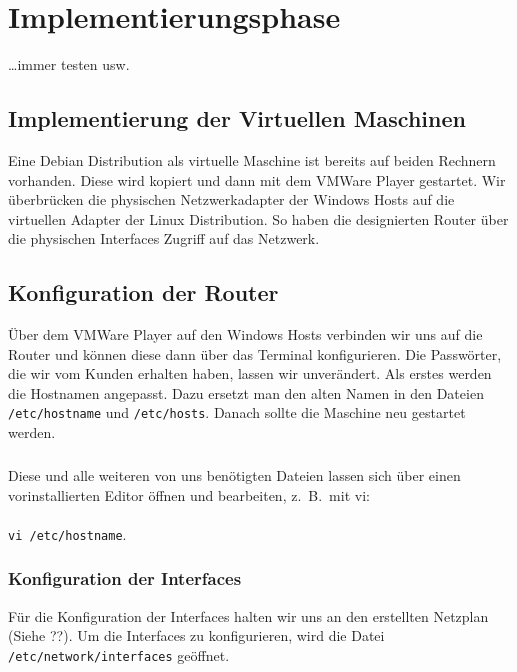 \section{Implementierungsphase} 
\label{sec:Implementierungsphase}

\dots immer testen usw.


\subsection{Implementierung der Virtuellen Maschinen}
\label{subsec:ImplementierungVMs}
Eine Debian Distribution als virtuelle Maschine ist bereits auf beiden Rechnern vorhanden. Diese wird kopiert und dann mit dem VMWare Player gestartet. Wir überbrücken die physischen Netzwerkadapter der Windows Hosts auf die virtuellen Adapter der Linux Distribution. So haben die designierten Router über die physischen Interfaces Zugriff auf das Netzwerk. 


\subsection{Konfiguration der Router}
\label{subsec:KonfigurationRouter}

Über dem VMWare Player auf den Windows Hosts verbinden wir uns auf die Router und können diese dann über das Terminal konfigurieren. Die Passwörter, die wir vom Kunden erhalten haben, lassen wir unverändert. Als erstes werden die Hostnamen angepasst. Dazu ersetzt man den alten Namen in den Dateien \texttt{/etc/hostname} und \texttt{/etc/hosts}. Danach sollte die Maschine neu gestartet werden.
\subparagraph*{} Diese und alle weiteren von uns benötigten Dateien lassen sich über einen vorinstallierten Editor öffnen und bearbeiten, z.\ B.\ mit vi:\\\\
\noindent\hspace*{42mm} \texttt{vi /etc/hostname}.

\subsubsection{Konfiguration der Interfaces}
\label{subsubsec:KonfigurationInsideRouterInt}
Für die Konfiguration der Interfaces halten wir uns an den erstellten Netzplan (Siehe ??).
Um die Interfaces zu konfigurieren, wird die Datei \texttt{/etc/network/interfaces} geöffnet.

